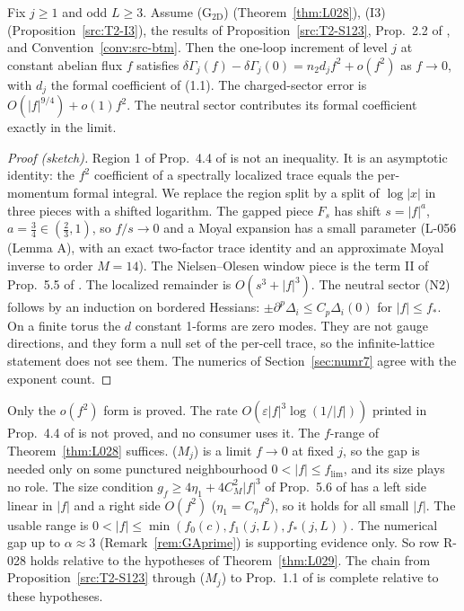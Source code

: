 \begin{theorem}\label{thm:L029}
Fix $j\ge1$ and odd $L\ge3$. Assume (G$_{\mathrm{2D}}$) (Theorem~\ref{thm:L028}), (I3) (Proposition~\ref{src:T2-I3}), the results of Proposition~\ref{src:T2-S123}, Prop.\ 2.2 of , and Convention~\ref{conv:src-btm}. Then the one-loop increment of level $j$ at constant abelian flux $f$ satisfies $\delta\Gamma_j(f)-\delta\Gamma_j(0)=n_2d_jf^2+o(f^2)$ as $f\to0$, with $d_j$ the formal coefficient of  (1.1). The charged-sector error is $O(|f|^{9/4})+o(1)f^2$. The neutral sector contributes its formal coefficient exactly in the limit.
\end{theorem}
\begin{proof}[Proof (sketch)]
Region 1 of Prop.\ 4.4 of  is not an inequality. It is an asymptotic identity: the $f^2$ coefficient of a spectrally localized trace equals the per-momentum formal integral. We replace the region split by a split of $\log|x|$ in three pieces with a shifted logarithm. The gapped piece $F_s$ has shift $s=|f|^a$, $a=\tfrac34\in(\tfrac23,1)$, so $f/s\to0$ and a Moyal expansion has a small parameter (L-056 (Lemma A), with an exact two-factor trace identity and an approximate Moyal inverse to order $M=14$). The Nielsen--Olesen window piece is the term II of Prop.\ 5.5 of . The localized remainder is $O(s^3+|f|^3)$. The neutral sector (N2) follows by an induction on bordered Hessians: $\pm\partial^p\Delta_i\le C_p\Delta_i(0)$ for $|f|\le f_*$. On a finite torus the $d$ constant 1-forms are zero modes. They are not gauge directions, and they form a null set of the per-cell trace, so the infinite-lattice statement does not see them. The numerics of Section~\ref{sec:numr7} agree with the exponent count.
\end{proof}
Only the $o(f^2)$ form is proved. The rate $O(\varepsilon|f|^3\log(1/|f|))$ printed in Prop.\ 4.4 of  is not proved, and no consumer uses it.
The $f$-range of Theorem~\ref{thm:L028} suffices. ($M_j$) is a limit $f\to0$ at fixed $j$, so the gap is needed only on some punctured neighbourhood $0<|f|\le f_{\lim}$, and its size plays no role. The size condition $g_f\ge4\eta_1+4C_M^2|f|^3$ of Prop.\ 5.6 of  has a left side linear in $|f|$ and a right side $O(f^2)$ ($\eta_1=C_\eta f^2$), so it holds for all small $|f|$. The usable range is $0<|f|\le\min(f_0(c),f_1(j,L),f_*(j,L))$. The numerical gap up to $\alpha\approx3$ (Remark~\ref{rem:GAprime}) is supporting evidence only.
So row R-028 holds relative to the hypotheses of Theorem~\ref{thm:L029}. The chain from Proposition~\ref{src:T2-S123} through ($M_j$) to Prop.\ 1.1 of  is complete relative to these hypotheses.

